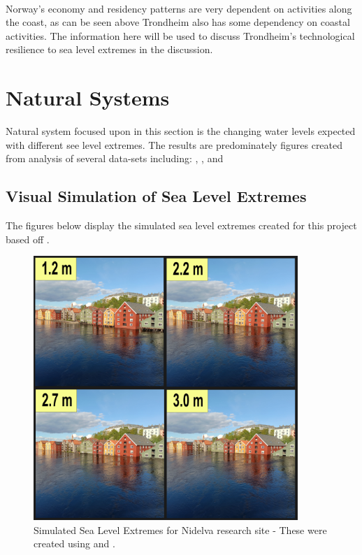 \paragraph{}

Norway's economy and residency patterns are very dependent on activities along the coast\cite{aunan_strong_2008}, as can be seen above Trondheim also has some dependency on coastal activities. The information here will be used to discuss Trondheim's technological resilience to sea level extremes in the discussion. 


\section{Natural Systems}
Natural system focused upon in this section is the changing water levels expected with different see level extremes. The results are predominately figures created from analysis of several  data-sets including: \cite{geonorge_stormflo_nodate} , \cite{kartverket_se_2021}, \cite{stormflo_database_stormflo_2021} and \cite{ipcc_sea_2021}

\subsection{Visual Simulation of Sea Level Extremes}
The figures below display the simulated sea level extremes created for this project based off \cite{kartverket_se_2020}.

\begin{figure}[h!]
    \centering
    \includegraphics[width=10cm]{fig_sle/nidelva 2090 q.png}
    \caption{Simulated Sea Level Extremes for Nidelva research site - These were created using \cite{kartverket_se_2021} and \cite{stormflo_database_stormflo_2021}. }
    \label{fig:SLE-nidelva}
\end{figure}

